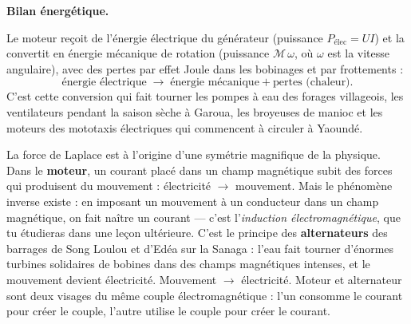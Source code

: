 \documentclass[11pt]{article}
\begin{document}
\textbf{Bilan énergétique.}\par
Le moteur reçoit de l'énergie électrique du générateur (puissance $P_{\text{élec}} = UI$) et la convertit en énergie mécanique de rotation (puissance $\mathcal{M}\,\omega$, où $\omega$ est la vitesse angulaire), avec des pertes par effet Joule dans les bobinages et par frottements :
\[ \text{énergie électrique} \;\longrightarrow\; \text{énergie mécanique} + \text{pertes (chaleur)}. \]
C'est cette conversion qui fait tourner les pompes à eau des forages villageois, les ventilateurs pendant la saison sèche à Garoua, les broyeuses de manioc et les moteurs des mototaxis électriques qui commencent à circuler à Yaoundé.

\begin{savaistu}
La force de Laplace est à l'origine d'une symétrie magnifique de la physique. Dans le \textbf{moteur}, un courant placé dans un champ magnétique subit des forces qui produisent du mouvement : électricité $\rightarrow$ mouvement. Mais le phénomène inverse existe : en imposant un mouvement à un conducteur dans un champ magnétique, on fait naître un courant — c'est l'\emph{induction électromagnétique}, que tu étudieras dans une leçon ultérieure. C'est le principe des \textbf{alternateurs} des barrages de Song Loulou et d'Edéa sur la Sanaga : l'eau fait tourner d'énormes turbines solidaires de bobines dans des champs magnétiques intenses, et le mouvement devient électricité. Mouvement $\rightarrow$ électricité. Moteur et alternateur sont deux visages du même couple électromagnétique : l'un consomme le courant pour créer le couple, l'autre utilise le couple pour créer le courant.
\end{savaistu}
\end{document}

